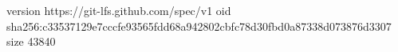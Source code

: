 version https://git-lfs.github.com/spec/v1
oid sha256:c33537129e7cccfe93565fdd68a942802cbfc78d30fbd0a87338d073876d3307
size 43840
